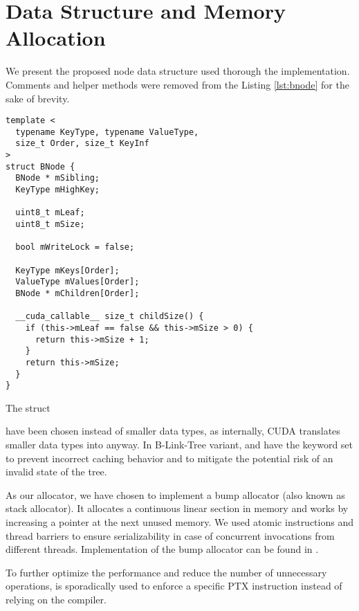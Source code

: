 \section{Data Structure and Memory Allocation}

We present the proposed node data structure used thorough the implementation. Comments and helper methods were removed from the Listing \ref{lst:bnode} for the sake of brevity.

\begin{listing}
  \begin{verbatim}
template <
  typename KeyType, typename ValueType,
  size_t Order, size_t KeyInf
>
struct BNode {
  BNode * mSibling;
  KeyType mHighKey;

  uint8_t mLeaf;
  uint8_t mSize;

  bool mWriteLock = false;

  KeyType mKeys[Order];
  ValueType mValues[Order];
  BNode * mChildren[Order]; 

  __cuda_callable__ size_t childSize() {
    if (this->mLeaf == false && this->mSize > 0) {
      return this->mSize + 1;
    }
    return this->mSize;
  }
}
    \end{verbatim}
  \caption{The  struct}\label{lst:bnode}
\end{listing}

 have been chosen instead of smaller data types, as internally, CUDA translates smaller data types into  anyway. In B-Link-Tree variant,  and  have the  keyword set to prevent incorrect caching behavior and to mitigate the potential risk of an invalid state of the tree.

As our allocator, we have chosen to implement a bump allocator (also known as stack allocator). It allocates a continuous linear section in memory and works by increasing a pointer at the next unused memory. We used atomic instructions and thread barriers to ensure serializability in case of concurrent invocations from different threads. Implementation of the bump allocator can be found in .

To further optimize the performance and reduce the number of unnecessary operations,  is sporadically used to enforce a specific PTX instruction instead of relying on the  compiler.